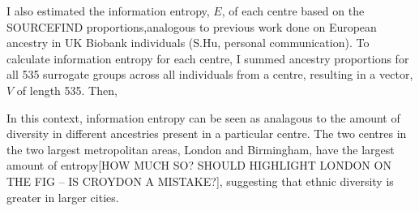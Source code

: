 I also estimated the information entropy, $E$, of each centre based on the SOURCEFIND proportions,analogous to previous work done on European ancestry in UK Biobank individuals (S.Hu, personal communication). To calculate information entropy for each centre, I summed ancestry proportions for all 535 surrogate groups across all individuals from a centre, resulting in a vector, $V$ of length 535. Then,  


 In this context, information entropy can be seen as analagous to the amount of diversity in different ancestries present in a particular centre. The two centres in the two largest metropolitan areas, London and Birmingham, have the largest amount of entropy{\color{red}[HOW MUCH SO? SHOULD HIGHLIGHT LONDON ON THE FIG -- IS CROYDON A MISTAKE?]}, suggesting that ethnic diversity is greater in larger cities.

